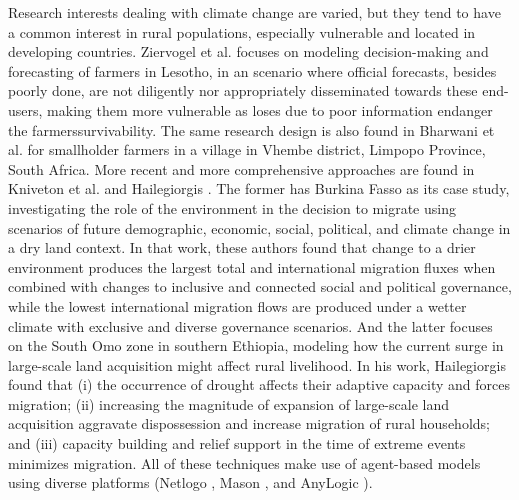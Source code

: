 \documentclass{article}
\begin{document}
Research interests dealing with climate change are varied, but they tend to have a common interest in rural populations, especially vulnerable and located in developing countries. Ziervogel et al.\cite{ziervogel_agent-based_2005} focuses on modeling decision-making and forecasting of farmers in Lesotho, in an scenario where official forecasts, besides poorly done, are not diligently nor appropriately disseminated towards these end-users, making them more vulnerable as loses due to poor information endanger the farmers\textquotesingle survivability. The same research design is also found in Bharwani et al. \cite{bharwani_multiagent_2005} for smallholder farmers in a village in Vhembe district, Limpopo Province, South Africa. More recent and more comprehensive approaches are found in Kniveton et al. \cite{kniveton_agent-based_2011} and Hailegiorgis \cite{hailegiorgis_computational_2013}. The former has Burkina Fasso as its case study, investigating the role of the environment in the decision to migrate using scenarios of future demographic, economic, social, political, and climate change in a dry land context. In that work, these authors found that change to a drier environment produces the largest total and international migration fluxes when combined with changes to inclusive and connected social and political governance, while the lowest international migration flows are produced under a wetter climate with exclusive and diverse governance scenarios. And the latter focuses on the South Omo zone in southern Ethiopia, modeling how the current surge in large-scale land acquisition might affect rural livelihood. In his work,  Hailegiorgis found that (i) the occurrence of drought affects their adaptive capacity and forces migration; (ii) increasing the magnitude of expansion of large-scale land acquisition aggravate dispossession and increase migration of rural households; and (iii) capacity building and relief support in the time of extreme events minimizes migration. All of these techniques make use of agent-based models using diverse platforms (Netlogo \cite{wilensky_introduction_2015}, Mason \cite{luke_mason_2015}, and AnyLogic \cite{anylogic_2015}).
\par
\end{document}
